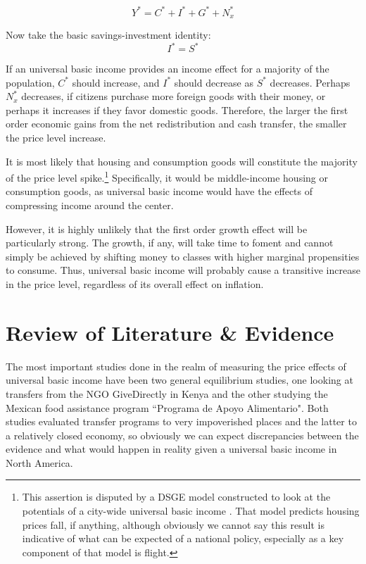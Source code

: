 \documentclass[paper=a4, fontsize=11pt,twoside]{scrartcl}
\begin{document}
\begin{equation}
Y^* = C^* + I^* + G^* + N_x^*
\end{equation}

Now take the basic savings-investment identity:
\begin{equation}
I^* = S^*
\end{equation}

If an universal basic income provides an income effect for a majority of the population, $C^*$ should increase, and $I^*$ should decrease as $S^*$ decreases. Perhaps $N_x^*$ decreases, if citizens purchase more foreign goods with their money, or perhaps it increases if they favor domestic goods. Therefore, the larger the first order economic gains from the net redistribution and cash transfer, the smaller the price level increase. 

It is most likely that housing and consumption goods will constitute the majority of the price level spike.\footnote{This assertion is disputed by a DSGE model constructed to look at the potentials of a city-wide universal basic income  \parencite{city}. That model predicts housing prices fall, if anything, although obviously we cannot say this result is indicative of what can be expected of a national policy, especially as a key component of that model is flight.} Specifically, it would be middle-income housing or consumption goods, as universal basic income would have the effects of compressing income around the center. 

However, it is highly unlikely that the first order growth effect will be particularly strong. The growth, if any, will take time to foment and cannot simply be achieved by shifting money to classes with higher marginal propensities to consume. Thus, universal basic income will probably cause a transitive increase in the price level, regardless of its overall effect on inflation.

\section{Review of Literature \& Evidence}
The most important studies done in the realm of measuring the price effects of universal basic income have been two general equilibrium studies, one looking at transfers from the NGO GiveDirectly in Kenya\autocite{NBERw26600} and the other studying the Mexican food assistance program ``Programa de Apoyo Alimentario".\autocite{NBERw17456}  Both studies evaluated transfer programs to very impoverished places and the latter to a relatively closed economy, so obviously we can expect discrepancies between the evidence and what would happen in reality given a universal basic income in North America. 
\end{document}
